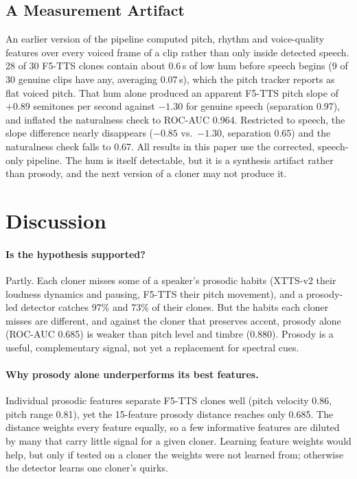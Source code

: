 \documentclass[11pt,a4paper]{article}
\begin{document}
\subsection{A Measurement Artifact}
\label{sec:artifact}
An earlier version of the pipeline computed pitch, rhythm and voice-quality features over every voiced frame of a clip rather than only inside detected speech. 28 of 30 F5-TTS clones contain about 0.6\,s of low hum before speech begins (9 of 30 genuine clips have any, averaging 0.07\,s), which the pitch tracker reports as flat voiced pitch. That hum alone produced an apparent F5-TTS pitch slope of $+0.89$ semitones per second against $-1.30$ for genuine speech (separation 0.97), and inflated the naturalness check to ROC-AUC 0.964. Restricted to speech, the slope difference nearly disappears ($-0.85$ vs.\ $-1.30$, separation 0.65) and the naturalness check falls to 0.67. All results in this paper use the corrected, speech-only pipeline. The hum is itself detectable, but it is a synthesis artifact rather than prosody, and the next version of a cloner may not produce it.

\section{Discussion}
\paragraph{Is the hypothesis supported?} Partly. Each cloner misses some of a speaker's prosodic habits (XTTS-v2 their loudness dynamics and pausing, F5-TTS their pitch movement), and a prosody-led detector catches 97\% and 73\% of their clones. But the habits each cloner misses are different, and against the cloner that preserves accent, prosody alone (ROC-AUC 0.685) is weaker than pitch level and timbre (0.880). Prosody is a useful, complementary signal, not yet a replacement for spectral cues.

\paragraph{Why prosody alone underperforms its best features.} Individual prosodic features separate F5-TTS clones well (pitch velocity 0.86, pitch range 0.81), yet the 15-feature prosody distance reaches only 0.685. The distance weights every feature equally, so a few informative features are diluted by many that carry little signal for a given cloner. Learning feature weights would help, but only if tested on a cloner the weights were not learned from; otherwise the detector learns one cloner's quirks.
\end{document}
